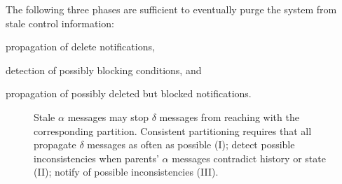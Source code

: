 

\begin{theorem}
  The following three phases are sufficient to eventually purge the
  system from stale control information:
  \begin{inparaenum}[(i)]
  \item propagation of delete notifications,
  \item detection of possibly blocking conditions, and
  \item propagation of possibly deleted but blocked notifications.
  \end{inparaenum}
\end{theorem}

\begin{figure}
  \centering
  \caption{\label{fig:proofB}Stale $\alpha$ messages may stop $\delta$
    messages from reaching \processes with the corresponding
    partition. Consistent partitioning requires that all \processes
    propagate $\delta$ messages as often as possible (I); detect
    possible inconsistencies when parents' $\alpha$ messages
    contradict history or state (II); notify \processes of possible
    inconsistencies (III).}
\end{figure}

